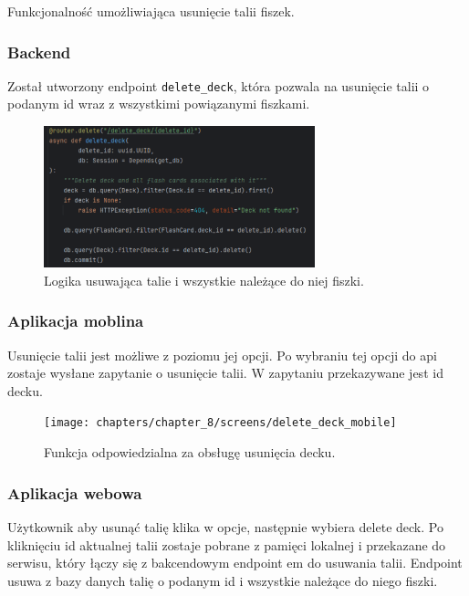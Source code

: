 Funkcjonalność umożliwiająca usunięcie talii fiszek.

\subsubsection{Backend}

Został utworzony endpoint \texttt{delete_deck}, która pozwala na usunięcie talii o podanym id wraz z wszystkimi powiązanymi fiszkami.

\begin{figure}[H]
    \centering
    \includegraphics[width=0.7\textwidth]{chapters/chapter_8/screens/delete_deck_backend}
    \caption{Logika usuwająca talie i wszystkie należące do niej fiszki.}
    \label{img:delete_deck_backend}
\end{figure}


\subsubsection{Aplikacja moblina}
Usunięcie talii jest możliwe z poziomu jej opcji. Po wybraniu tej opcji do api zostaje wysłane zapytanie o usunięcie talii. W zapytaniu przekazywane jest id decku.

\begin{figure}[H]
    \centering
    \texttt{[image: chapters/chapter\_8/screens/delete\_deck\_mobile]}
    \caption{Funkcja odpowiedzialna za obsługę usunięcia decku.}
    \label{img:delete_deck_mobile}
\end{figure}

\subsubsection{Aplikacja webowa}

Użytkownik aby usunąć talię klika w opcje, następnie wybiera delete deck. Po kliknięciu id aktualnej talii zostaje pobrane z pamięci lokalnej i przekazane do serwisu, który łączy się z bakcendowym endpoint em do usuwania talii. Endpoint usuwa z bazy danych talię o podanym id i wszystkie należące do niego fiszki.

